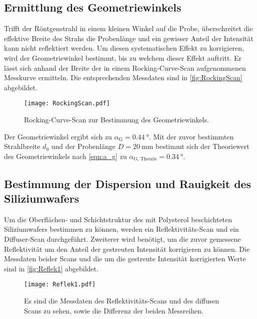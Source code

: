\subsection{Ermittlung des Geometriewinkels}
Trifft der Röntgenstrahl in einem kleinen Winkel auf die Probe, überschreitet die effektive Breite des Strahs die Probenlänge und ein 
gewisser Anteil der Intensität kann nicht reflektiert werden. Um diesen systematischen Effekt zu korrigieren, wird der Geometriewinkel bestimmt, bis zu welchem dieser 
Effekt auftritt. Er lässt sich anhand der Breite der in einem Rocking-Curve-Scan aufgenommenen Messkurve ermitteln.
Die entsprechenden Messdaten sind in \autoref{fig:RockingScan} abgebildet.
\begin{figure}
  \centering
  \texttt{[image: RockingScan.pdf]}
  \caption{Rocking-Curve-Scan zur Bestimmung des Geometriewinkels.}
  \label{fig:RockingScan}
\end{figure}
Der Geometriewinkel ergibt sich zu $\alpha_\text{G} = \qty{0.44}{\degree}$. Mit der zuvor bestimmten Strahlbreite $d_0$ und der Probenlänge $D = \qty{20}{\milli\metre}$ bestimmt 
sich der Theoriewert des Geometriewinkels nach \autoref{eqn:a_g} zu $\alpha_\text{G, Theorie} = \qty{0.34}{\degree}$.

\subsection{Bestimmung der Dispersion und Rauigkeit des Siliziumwafers}
Um die Oberflächen- und Schichtstruktur des mit Polysterol beschichteten Siliziumwafers bestimmen zu können, werden ein Reflektivitäts-Scan und ein Diffuser-Scan durchgeführt.
Zweiterer wird benötigt, um die zuvor gemessene Reflektivität um den Anteil der gestreuten Intensität korrigieren zu können. Die Messdaten beider Scans und die um die gestreute 
Intensität korrigierten Werte sind in \autoref{fig:Reflek1} abgebildet.
\begin{figure}
  \centering
  \texttt{[image: Reflek1.pdf]}
  \caption{Es sind die Messdaten des Reflektivitäts-Scans und des diffusen Scans zu sehen, sowie die Differenz der beiden Messreihen.}
  \label{fig:Reflek1}
\end{figure}

